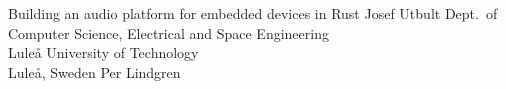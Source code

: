 \documentclass[12pt,a4paper,openright,final,twoside]{LTU-Report-Theme/cseethesis}
\begin{document}





\def\thesistitle{Building an audio platform for embedded devices in Rust}

\def\theauthor{Josef Utbult}
\def\theaddress{Dept.\ of Computer Science, Electrical and Space Engineering\\
Luleå University of Technology\\ Luleå, Sweden}

\def\supervisors{Per Lindgren}

\def\supervisorstring{Supervisor:} 

\def\dedication{}

\def\theabstract{}
\def\thepreface{}

\createpreamble
  {\thesistitle}
  {\theauthor}
  {\theaddress}
  {\supervisors}
  {\dedication}
  {\theabstract}
  {\thepreface}

\startchapters
\begin{bibunit}[IEEEtran]

	
	

	\makebib

\end{bibunit}
\end{document}
